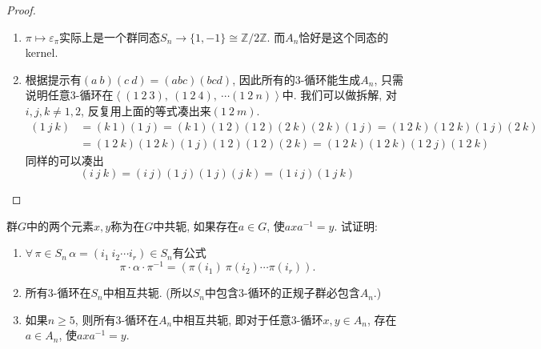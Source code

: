 \documentclass{../solutions-cn}
\begin{document}
\begin{proof}
    \begin{enumerate}[(1)]
        \item $\pi \mapsto \varepsilon_\pi$实际上是一个群同态$S_n \to \{1, -1\} \cong \mathbb{Z}/2\mathbb{Z}$. 而$A_n$恰好是这个同态的kernel.
        \item 根据提示有$(a\:b)(c\:d) = (abc)(bcd)$, 因此所有的$3$-循环能生成$A_n$, 只需说明任意$3$-循环在$\left\langle (1\:2\:3),\: (1\:2\:4),\: \cdots (1\:2\:n) \right\rangle$中. 我们可以做拆解, 对$i, j, k \neq 1, 2$, 反复用上面的等式凑出来$(1\:2\:m)$.
        \[
        \begin{aligned}
            (1\:j\:k) &= (k\:1)(1\:j) = (k\:1)(1\:2)(1\:2)(2\:k)(2\:k)(1\:j) = (1\:2\:k)(1\:2\:k)(1\:j)(2\:k)\\
            &= (1\:2\:k)(1\:2\:k)(1\:j)(1\:2)(1\:2)(2\:k) = (1\:2\:k)(1\:2\:k)(1\:2\:j)(1\:2\:k)
        \end{aligned}
        \]
        同样的可以凑出
        \[
            (i\:j\:k) = (i\:j)(1\:j)(1\:j)(j\:k) = (1\:i\:j)(1\:j\:k)
        \]
    \end{enumerate}
\end{proof}

\begin{exercise}[习题4.2.5]
    群$G$中的两个元素$x, y$称为在$G$中共轭, 如果存在$a \in G$, 使$axa^{-1} = y$. 试证明: 
    \begin{enumerate}[(1)]
        \item $\forall\, \pi \in S_n\, \alpha = (i_1\:i_2 \cdots i_r) \in S_n$有公式
        \[
            \pi \cdot \alpha \cdot \pi^{-1} = (\pi(i_1)\:\pi(i_2) \cdots \pi(i_r)).
        \]
        \item 所有$3$-循环在$S_n$中相互共轭. (所以$S_n$中包含$3$-循环的正规子群必包含$A_n$.)
        \item 如果$n \geqslant 5$, 则所有$3$-循环在$A_n$中相互共轭, 即对于任意$3$-循环$x,y \in A_n$, 存在$a \in A_n$, 使$axa^{-1} = y$.
    \end{enumerate}
\end{exercise}
\end{document}
